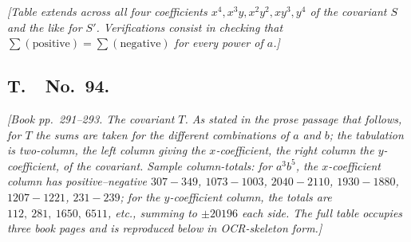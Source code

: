\documentclass[11pt]{article}
\begin{document}
\textit{[Table extends across all four coefficients $x^4, x^3 y, x^2 y^2, xy^3, y^4$ of the covariant $S$ and the like for $S'$. Verifications consist in checking that $\sum (\text{positive}) = \sum (\text{negative})$ for every power of $a$.]}

\bigskip

\subsection*{T.\ \ No.\ 94.}

\textit{[Book pp.~291--293. The covariant $T$. As stated in the prose passage that follows, for $T$ the sums are taken \textit{for the different combinations of $a$ and $b$}; the tabulation is two-column, the left column giving the $x$-coefficient, the right column the $y$-coefficient, of the covariant. Sample column-totals: for $a^3 b^5$, the $x$-coefficient column has positive--negative $307-349$, $1073-1003$, $2040-2110$, $1930-1880$, $1207-1221$, $231-239$; for the $y$-coefficient column, the totals are $112,\ 281,\ 1650,\ 6511$, etc., summing to $\pm 20196$ each side. The full table occupies three book pages and is reproduced below in OCR-skeleton form.]}

\smallskip
\end{document}
